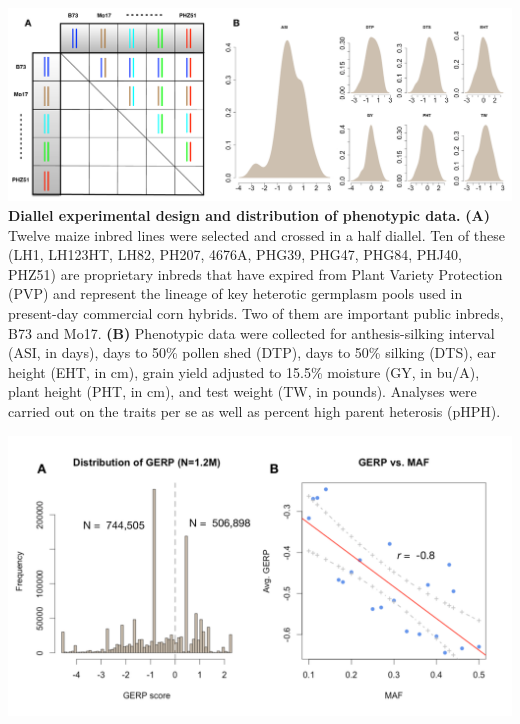 \documentclass[10pt]{article}
\begin{document}
\begin{center}\vspace{1cm}
\includegraphics[width=0.8\linewidth]{pvp.pdf}
{\color{black} \textbf{Diallel experimental design and distribution of phenotypic data.}
\textbf{(A)} Twelve maize inbred lines were selected and crossed in a half diallel. Ten of these (LH1, LH123HT, LH82, PH207, 4676A, PHG39, PHG47, PHG84, PHJ40, PHZ51) are proprietary inbreds that have expired from Plant Variety Protection (PVP) and represent the lineage of key heterotic germplasm pools used in present-day commercial corn hybrids. Two of them are important public inbreds, B73 and Mo17. \textbf{(B)} Phenotypic data were collected for anthesis-silking interval (ASI, in days), days to 50\% pollen shed (DTP), days to 50\% silking (DTS), ear height (EHT, in cm), grain yield adjusted to 15.5\% moisture (GY, in bu/A), plant height (PHT, in cm), and test weight (TW, in pounds). Analyses were carried out on the traits per se as well as percent high parent heterosis (pHPH).
}
\end{center}\vspace{1cm}



\begin{center}\vspace{1cm}
\includegraphics[width=0.8\linewidth]{gerp.pdf}
\end{center}\vspace{1cm}
\end{document}
